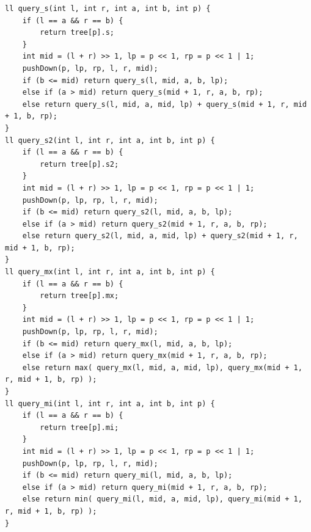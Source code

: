 \documentclass[a4paper]{article}
\begin{document}
\begin{CJK*}{UTF8}{gbsn}
\begin{multicols}{3}
\begin{flushleft}
\begin{lstlisting}
ll query_s(int l, int r, int a, int b, int p) {
    if (l == a && r == b) {
        return tree[p].s;
    }
    int mid = (l + r) >> 1, lp = p << 1, rp = p << 1 | 1;
    pushDown(p, lp, rp, l, r, mid);
    if (b <= mid) return query_s(l, mid, a, b, lp);
    else if (a > mid) return query_s(mid + 1, r, a, b, rp);
    else return query_s(l, mid, a, mid, lp) + query_s(mid + 1, r, mid + 1, b, rp);
}
ll query_s2(int l, int r, int a, int b, int p) {
    if (l == a && r == b) {
        return tree[p].s2;
    }
    int mid = (l + r) >> 1, lp = p << 1, rp = p << 1 | 1;
    pushDown(p, lp, rp, l, r, mid);
    if (b <= mid) return query_s2(l, mid, a, b, lp);
    else if (a > mid) return query_s2(mid + 1, r, a, b, rp);
    else return query_s2(l, mid, a, mid, lp) + query_s2(mid + 1, r, mid + 1, b, rp);
}
ll query_mx(int l, int r, int a, int b, int p) {
    if (l == a && r == b) {
        return tree[p].mx;
    }
    int mid = (l + r) >> 1, lp = p << 1, rp = p << 1 | 1;
    pushDown(p, lp, rp, l, r, mid);
    if (b <= mid) return query_mx(l, mid, a, b, lp);
    else if (a > mid) return query_mx(mid + 1, r, a, b, rp);
    else return max( query_mx(l, mid, a, mid, lp), query_mx(mid + 1, r, mid + 1, b, rp) );
}
ll query_mi(int l, int r, int a, int b, int p) {
    if (l == a && r == b) {
        return tree[p].mi;
    }
    int mid = (l + r) >> 1, lp = p << 1, rp = p << 1 | 1;
    pushDown(p, lp, rp, l, r, mid);
    if (b <= mid) return query_mi(l, mid, a, b, lp);
    else if (a > mid) return query_mi(mid + 1, r, a, b, rp);
    else return min( query_mi(l, mid, a, mid, lp), query_mi(mid + 1, r, mid + 1, b, rp) );
}

\end{lstlisting}



\end{flushleft}
\end{multicols}
\end{CJK*}
\end{document}
